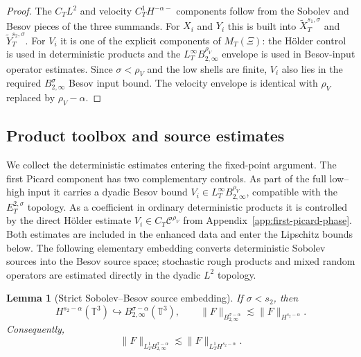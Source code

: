 \documentclass[10pt]{amsart}
\numberwithin{equation}{section}
\theoremstyle{plain}
\newtheorem{lemma}[theorem]{Lemma}
\theoremstyle{definition}
\theoremstyle{remark}
\newcommand{\T}{\mathbb{T}}
\newcommand{\C}{\mathcal{C}}
\begin{document}
\begin{proof}
The $C_TL^2$ and velocity $C_T^1H^{-\alpha-}$ components follow from the Sobolev and Besov pieces of the three summands.  For $X_i$ and $Y_i$ this is built into $\widetilde X_T^{s_1,\sigma}$ and $\widetilde Y_T^{s_2,\sigma}$.  For $V_i$ it is one of the explicit components of $M_T(\Xi)$: the H\"older control is used in deterministic products and the $L_T^\infty B_{2,\infty}^{\rho_V}$ envelope is used in Besov-input operator estimates.  Since $\sigma<\rho_V$ and the low shells are finite, $V_i$ also lies in the required $B_{2,\infty}^{\sigma}$ Besov input bound.  The velocity envelope is identical with $\rho_V$ replaced by $\rho_V-\alpha$.
\end{proof}


\subsection{Product toolbox and source estimates}\label{subsec:product-toolbox}
We collect the deterministic estimates entering the fixed-point argument.  The first Picard component has two complementary controls.  As part of the full low--high input it carries a dyadic Besov bound $V_i\in L_T^\infty B_{2,\infty}^{\rho_V}$, compatible with the $E_T^{2,\sigma}$ topology.  As a coefficient in ordinary deterministic products it is controlled by the direct H\"older estimate $V_i\in C_T\C^{\rho_V}$ from Appendix~\ref{app:first-picard-phase}.  Both estimates are included in the enhanced data and enter the Lipschitz bounds below.  The following elementary embedding converts deterministic Sobolev sources into the Besov source space; stochastic rough products and mixed random operators are estimated directly in the dyadic $L^2$ topology.

\begin{lemma}[Strict Sobolev--Besov source embedding]\label{lem:sobolev-to-besov-source}
If $\sigma<s_2$, then
\begin{equation}\label{eq:sob-to-besov-source}
        H^{s_2-\alpha}(\T^3)\hookrightarrow B_{2,\infty}^{\sigma-\alpha}(\T^3),
        \qquad
        \|F\|_{B_{2,\infty}^{\sigma-\alpha}}
        \lesssim \|F\|_{H^{s_2-\alpha}}.
\end{equation}
Consequently,
\begin{equation}\label{eq:LT1-sob-to-besov-source}
        \|F\|_{L_T^1B_{2,\infty}^{\sigma-\alpha}}
        \lesssim
        \|F\|_{L_T^1H^{s_2-\alpha}}.
\end{equation}
\end{lemma}
\end{document}
